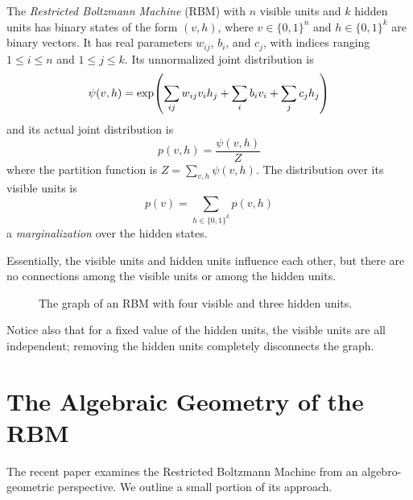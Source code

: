 \documentclass[cclicense]{hmcthesis}
\numberwithin{equation}{section}
\begin{document}
    \begin{definition}
    The \emph{Restricted Boltzmann Machine} (RBM) with $n$ visible units and $k$
    hidden units has binary states of the form $(v, h)$, where $v \in \{0,1\}^n$
    and $h \in \{0,1\}^k$ are binary vectors.  It has real parameters $w_{ij}$,
    $b_i$, and $c_j$, with indices ranging $1 \le i \le n$ and $1 \le j \le k$.
    Its unnormalized joint distribution is
    \begin{equation}\label{eq:rbm-unnorm}
        \psi(v, h) = \exp\pdel*{
            \sum_{ij} w_{ij} v_i h_j + \sum_i b_i v_i + \sum_j c_j h_j
        }
    \end{equation}
    and its actual joint distribution is 
    \[
        p(v, h) = \frac{\psi(v,h)}{Z}
    \] 
    where the partition function is $Z = \sum_{v,h} \psi(v, h)$.  The
    distribution over its visible units is
    \[
        p(v) = \sum_{h \in \{0,1\}^k} p(v,h)
    \]
    a \emph{marginalization} over the hidden states.
    \end{definition}
    Essentially, the visible units and hidden units influence each other, but
    there are no connections among the visible units or among the hidden units.
    \begin{figure}[H]
        \centering
        \caption{The graph of an RBM with four visible and three hidden units.}
    \end{figure}
    \noindent Notice also that for a fixed value of the hidden units, the
    visible units are all independent; removing the hidden units completely
    disconnects the graph.
    
\section{The Algebraic Geometry of the RBM}
    The recent paper \citep{CMS09} examines the Restricted Boltzmann Machine from
    an algebro-geometric perspective.  We outline a small portion of its
    approach.
    
\end{document}
